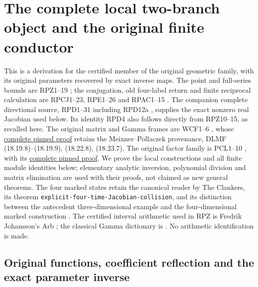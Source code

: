 \section{The complete local two-branch object and the original finite conductor}
\label{sec:real-pair-local-algebra}

This is a derivation for the certified member of the original geometric
family, with its original parameters recovered by exact inverse maps.
The point and full-series bounds are RPZ1--19 \cite{RPZ005};
the conjugation, old four-label return and finite reciprocal calculation
are RPCJ1--23, RPE1--26 and RPAC1--15
\cite{RPCJ005,RPE005,RPAC005}.
The companion complete directional source, RPD1--31 including RPD12a
\cite{RPD006,RPD31Source},
supplies the exact nonzero real Jacobian used below.  Its identity
RPD4 also follows directly from RPZ10--15, as recalled here.
The original matrix and Gamma frames are WCF1--6 \cite{WCF}, whose
\href{https://github.com/KokunoYumeto/zeta-function-research-reader/blob/5992ad50c0f2a06921f1fcaded7b4e38097c0739/workbenches/splitzero-tandem/continuations/20260920-original-kernel-mixed-determinants/providers/WEIGHTED_CONDUCTOR_FORWARD.tex#L28}{complete pinned proof}
retains the Meixner--Pollaczek provenance, DLMF
(18.19.8)--(18.19.9), (18.22.8), (18.23.7).
The original factor family is PCL1--10 \cite{PCLOriginal}, with its
\href{https://github.com/KokunoYumeto/zeta-function-research-reader/blob/487253b5b01851da5b9b98af4e146fecf1fab902/workbenches/splitzero-tandem/continuations/20260919-native-conductor-coprimality/providers/PCL_COMPLETE.tex#L19}{complete pinned proof}.
We prove the local constructions and all finite module identities below;
elementary analytic inversion, polynomial division and matrix elimination
are used with their proofs, not claimed as new general theorems.
The four marked states retain the canonical reader by The Clankers,
its theorem \texttt{explicit-four-time-Jacobian-collision}, and its
distinction between the antecedent three-dimensional example and the
four-dimensional marked construction \cite{ES488}.  The certified
interval arithmetic used in RPZ is Fredrik Johansson's Arb
\cite{human:arb2016}; the classical Gamma dictionary is
\cite{DLMF18Source}.  No arithmetic identification is made.

\subsection{Original functions, coefficient reflection and the exact parameter inverse}

